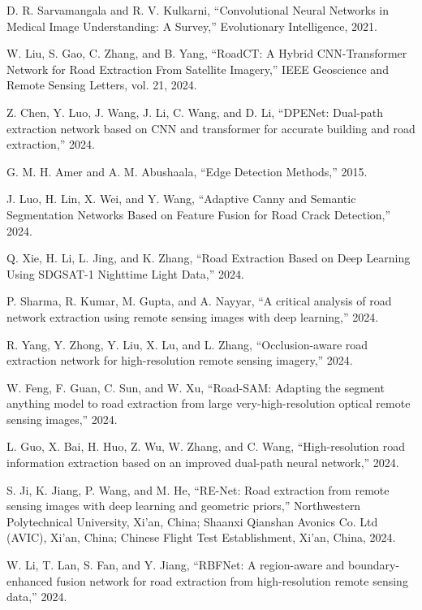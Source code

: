 \documentclass[conference]{IEEEtran}
\begin{document}
\begin{thebibliography}{99}

D. R. Sarvamangala and R. V. Kulkarni, “Convolutional Neural Networks in Medical Image Understanding: A Survey,” Evolutionary Intelligence, 2021.

W. Liu, S. Gao, C. Zhang, and B. Yang, “RoadCT: A Hybrid CNN-Transformer Network for Road Extraction From Satellite Imagery,” IEEE Geoscience and Remote Sensing Letters, vol. 21, 2024.

Z. Chen, Y. Luo, J. Wang, J. Li, C. Wang, and D. Li, “DPENet: Dual-path extraction network based on CNN and transformer for accurate building and road extraction,” 2024.

G. M. H. Amer and A. M. Abushaala, “Edge Detection Methods,” 2015.

J. Luo, H. Lin, X. Wei, and Y. Wang, “Adaptive Canny and Semantic Segmentation Networks Based on Feature Fusion for Road Crack Detection,” 2024.

Q. Xie, H. Li, L. Jing, and K. Zhang, “Road Extraction Based on Deep Learning Using SDGSAT-1 Nighttime Light Data,” 2024.

P. Sharma, R. Kumar, M. Gupta, and A. Nayyar, “A critical analysis of road network extraction using remote sensing images with deep learning,” 2024.

R. Yang, Y. Zhong, Y. Liu, X. Lu, and L. Zhang, “Occlusion-aware road extraction network for high-resolution remote sensing imagery,” 2024.

W. Feng, F. Guan, C. Sun, and W. Xu, “Road-SAM: Adapting the segment anything model to road extraction from large very-high-resolution optical remote sensing images,” 2024.

L. Guo, X. Bai, H. Huo, Z. Wu, W. Zhang, and C. Wang, “High-resolution road information extraction based on an improved dual-path neural network,” 2024.

S. Ji, K. Jiang, P. Wang, and M. He, “RE-Net: Road extraction from remote sensing images with deep learning and geometric priors,” Northwestern Polytechnical University, Xi’an, China; Shaanxi Qianshan Avonics Co. Ltd (AVIC), Xi’an, China; Chinese Flight Test Establishment, Xi’an, China, 2024.

W. Li, T. Lan, S. Fan, and Y. Jiang, “RBFNet: A region-aware and boundary-enhanced fusion network for road extraction from high-resolution remote sensing data,” 2024.


\end{thebibliography}
\end{document}
